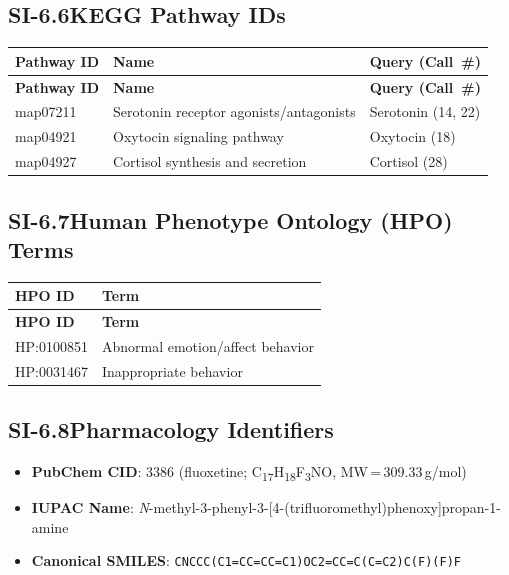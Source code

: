 \subsection*{SI-6.6\quad KEGG Pathway IDs}

\begin{longtable}{@{}l l l@{}}
\toprule
\textbf{Pathway ID} & \textbf{Name} & \textbf{Query (Call~\#)} \\
\midrule
\endfirsthead
\toprule
\textbf{Pathway ID} & \textbf{Name} & \textbf{Query (Call~\#)} \\
\midrule
\endhead
\bottomrule
\endlastfoot
map07211 & Serotonin receptor agonists/antagonists & Serotonin (14, 22) \\
map04921 & Oxytocin signaling pathway & Oxytocin (18) \\
map04927 & Cortisol synthesis and secretion & Cortisol (28) \\
\end{longtable}

\subsection*{SI-6.7\quad Human Phenotype Ontology (HPO) Terms}

\begin{longtable}{@{}l l@{}}
\toprule
\textbf{HPO ID} & \textbf{Term} \\
\midrule
\endfirsthead
\toprule
\textbf{HPO ID} & \textbf{Term} \\
\midrule
\endhead
\bottomrule
\endlastfoot
HP:0100851 & Abnormal emotion/affect behavior \\
HP:0031467 & Inappropriate behavior \\
\end{longtable}

\subsection*{SI-6.8\quad Pharmacology Identifiers}

\begin{itemize}[nosep]
  \item \textbf{PubChem CID}: 3386 (fluoxetine;
        C\textsubscript{17}H\textsubscript{18}F\textsubscript{3}NO,
        MW\,=\,309.33\,g/mol)
  \item \textbf{IUPAC Name}: \textit{N}-methyl-3-phenyl-3-[4-(trifluoromethyl)phenoxy]propan-1-amine
  \item \textbf{Canonical SMILES}: \texttt{CNCCC(C1=CC=CC=C1)OC2=CC=C(C=C2)C(F)(F)F}
\end{itemize}

